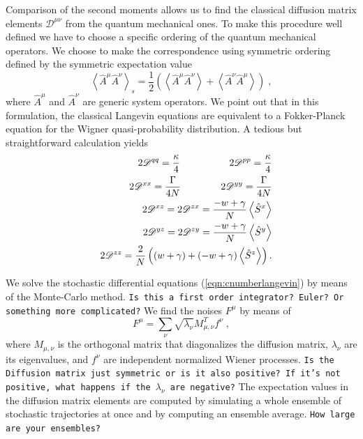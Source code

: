 \documentclass[aps,
twocolumn,
superscriptaddress,groupedaddress]{revtex4}
\newcommand{\dmcomment}[1]{{\tt #1}}
\begin{document}
Comparison of the second moments allows us to find the classical
diffusion matrix elements $\mathscr{D}^{\mu \nu}$ from the quantum
mechanical ones.  To make this procedure well defined we have to choose
a specific ordering of the quantum mechanical operators.  We choose to
make the correspondence using symmetric ordering defined by the
symmetric expectation value
\begin{equation}
\left< \hat{A}^{\mu} \hat{A}^{\nu} \right>_s=
\frac{1}{2} \left( \left< \hat{A}^{\mu} \hat{A}^{\nu} \right> + \left<
\hat{A}^{\nu} \hat{A}^{\mu} \right> \right)\;,
\end{equation}
where $\hat{A}^{\mu}$ and $\hat{A}^{\nu}$ are generic system operators.
We point out that in this formulation, the classical Langevin equations
are equivalent to a Fokker-Planck equation for the Wigner
quasi-probability distribution.  A tedious but straightforward
calculation yields
\begin{eqnarray}
&& 2\mathscr{D}^{q q}=
\frac{\kappa}{4} \hspace{0.7in} 2\mathscr{D}^{p p}=
\frac{\kappa}{4} \nonumber \\
&& 2\mathscr{D}^{xx}=
\frac{\Gamma}{4N} \hspace{0.57in} 2\mathscr{D}^{yy}=
\frac{\Gamma}{4N} \nonumber \\
&& 2\mathscr{D}^{xz}=
2\mathscr{D}^{zx}=
\frac{-w+\gamma}{N} \left< \hat{S}^{x} \right>  \nonumber \\
&& 2\mathscr{D}^{yz}=
2\mathscr{D}^{zy}=
\frac{-w+\gamma}{N} \left< \hat{S}^{y} \right>  \nonumber \\
&& 2\mathscr{D}^{zz}=
\frac{2}{N}\left((w+\gamma) + (-w+\gamma)  \left< \hat{S}^{z} \right> \right).
\label{cNoise1}
\end{eqnarray}

We solve the stochastic differential equations
(\ref{eqn:cnumberlangevin}) by means of the Monte-Carlo method.
\dmcomment{Is this a first order integrator? Euler? Or something more
complicated?} We find the noises $F^\mu$ by means of
\begin{equation}
F^\mu=\sum_\nu \sqrt{\lambda_\nu} M_{\mu,\nu}^T f^\nu\;,
\end{equation}
where $M_{\mu,\nu}$ is the orthogonal matrix that
diagonalizes the diffusion matrix, $\lambda_\nu$ are its eigenvalues,
and $f^\nu$ are independent normalized Wiener processes.
\dmcomment{Is the Diffusion matrix just symmetric or is it also
positive? If it's not positive, what happens if the $\lambda_\nu$ are
negative?}
The expectation values in the diffusion matrix elements are computed by
simulating a whole ensemble of stochastic trajectories at once and by
computing an ensemble average.
\dmcomment{How large are your ensembles?}
\end{document}
